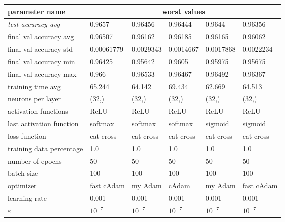 \begin{longtable}{|l|l|l|l|l|>{\columncolor{worstColumnColor}}l|}
\hline
\textbf{parameter name} & \multicolumn{5}{c|}{\textbf{worst values}} \\
\hline
\textit{test accuracy avg} &  0.9657 & 0.96456 & 0.96444 &  0.9644 & 0.96356 \\
final val accuracy avg   & 0.96507 & 0.96162 & 0.96185 & 0.96165 & 0.96062 \\
final val accuracy std   & 0.00061779 & 0.0029343 & 0.0014667 & 0.0017868 & 0.0022234 \\
final val accuracy min   & 0.96425 & 0.95642 & 0.9605  & 0.95975 & 0.95675 \\
final val accuracy max   & 0.966   & 0.96533 & 0.96467 & 0.96492 & 0.96367 \\
training time avg        & 65.244  & 64.142  & 69.434  & 62.669  & 64.513  \\
{\color{equalParamColor} neurons per layer } & {\color{equalParamColor} (32,) } & {\color{equalParamColor} (32,) } & {\color{equalParamColor} (32,) } & {\color{equalParamColor} (32,) } & {\color{equalParamColor} (32,) } \\
{\color{equalParamColor} activation functions } & {\color{equalParamColor} ReLU } & {\color{equalParamColor} ReLU } & {\color{equalParamColor} ReLU } & {\color{equalParamColor} ReLU } & {\color{equalParamColor} ReLU } \\
last activation function & softmax & softmax & softmax & sigmoid & sigmoid \\
{\color{equalParamColor} loss function } & {\color{equalParamColor} cat-cross } & {\color{equalParamColor} cat-cross } & {\color{equalParamColor} cat-cross } & {\color{equalParamColor} cat-cross } & {\color{equalParamColor} cat-cross } \\
{\color{equalParamColor} training data percentage } & {\color{equalParamColor} 1.0 } & {\color{equalParamColor} 1.0 } & {\color{equalParamColor} 1.0 } & {\color{equalParamColor} 1.0 } & {\color{equalParamColor} 1.0 } \\
{\color{equalParamColor} number of epochs } & {\color{equalParamColor} 50 } & {\color{equalParamColor} 50 } & {\color{equalParamColor} 50 } & {\color{equalParamColor} 50 } & {\color{equalParamColor} 50 } \\
{\color{equalParamColor} batch size } & {\color{equalParamColor} 100 } & {\color{equalParamColor} 100 } & {\color{equalParamColor} 100 } & {\color{equalParamColor} 100 } & {\color{equalParamColor} 100 } \\
optimizer                & fast cAdam & my Adam & cAdam   & my Adam & fast cAdam \\
{\color{equalParamColor} learning rate } & {\color{equalParamColor} 0.001 } & {\color{equalParamColor} 0.001 } & {\color{equalParamColor} 0.001 } & {\color{equalParamColor} 0.001 } & {\color{equalParamColor} 0.001 } \\
{\color{equalParamColor} $\varepsilon$ } & {\color{equalParamColor} $10^{-7}$ } & {\color{equalParamColor} $10^{-7}$ } & {\color{equalParamColor} $10^{-7}$ } & {\color{equalParamColor} $10^{-7}$ } & {\color{equalParamColor} $10^{-7}$ } \\
\hline


\end{longtable}
